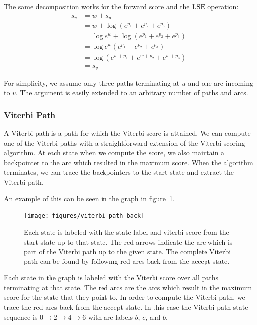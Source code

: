 The same decomposition works for the forward score and the $\operatorname*{\textrm{LSE}}$ operation:
\begin{align*}
s_v &= w + s_u  \\
    &= w + \log \left(e^{p_1} + e^{p_2} + e^{p_3}\right) \\
    &= \log e^w + \log \left(e^{p_1} + e^{p_2} + e^{p_3}\right) \\
    &= \log e^w \left(e^{p_1} + e^{p_2} + e^{p_3}\right) \\
    &= \log \left(e^{w + p_1} + e^{w + p_2} + e^{w + p_3}\right) \\
    &= s_v
\end{align*}

For simplicity, we assume only three paths terminating at $u$ and one arc
incoming to $v$. The argument is easily extended to an arbitrary number of
paths and arcs.

\subsubsection{Viterbi Path}

A Viterbi path is a path for which the Viterbi score is attained. We can
compute one of the Viterbi paths with a straightforward extension of the
Viterbi scoring algorithm. At each state when we compute the score, we also
maintain a backpointer to the arc which resulted in the maximum score. When the
algorithm terminates, we can trace the backpointers to the start state and
extract the Viterbi path.

An example of this can be seen in the graph in
figure~\ref{fig:viterbi_path_back}.

\begin{figure}
    \centering
    \texttt{[image: figures/viterbi\_path\_back]}
    \caption{Each state is labeled with the state label and viterbi score from
    the start state up to that state. The red arrows indicate the arc which is
    part of the Viterbi path up to the given state. The complete Viterbi path
    can be found by following red arcs back from the accept state.}
    \label{fig:viterbi_path_back}
\end{figure}

Each state in the graph is labeled with the Viterbi score over all paths
terminating at that state. The red arcs are the arcs which result in the
maximum score for the state that they point to. In order to compute the Viterbi
path, we trace the red arcs back from the accept state. In this case the
Viterbi path state sequence is $0 \rightarrow 2 \rightarrow 4 \rightarrow 6$
with arc labels $b$, $c$, and $b$.

